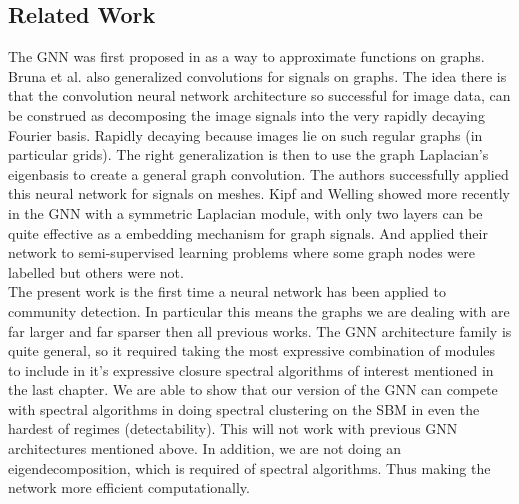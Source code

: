 \subsection{Related Work}
The GNN was first proposed in \cite{GNN} as a way to approximate functions on graphs. Bruna et al. also generalized convolutions for signals on graphs\cite{Bruna}.  The idea there is that the convolution neural network architecture so successful for image data, can be construed as decomposing the image signals into the very rapidly decaying Fourier basis.  Rapidly decaying because images lie on such regular graphs (in particular grids). The right generalization is then to use the graph Laplacian's eigenbasis to create a general graph convolution.  The authors successfully applied this neural network for signals on meshes.  Kipf and Welling showed more recently in \cite{kipf2016semi} the GNN with a symmetric Laplacian module, with only two layers can be quite effective as a embedding mechanism for graph signals.  And applied their network to semi-supervised learning problems where some graph nodes were labelled but others were not.\\

The present work is the first time a neural network has been applied to community detection.  In particular this means the graphs we are dealing with are far larger and far sparser then all previous works.  The GNN architecture family is quite general, so it required taking the most expressive combination of modules to include in it's expressive closure spectral algorithms of interest mentioned in the last chapter.  We are able to show that our version of the GNN can compete with spectral algorithms in doing spectral clustering on the SBM in even the hardest of regimes (detectability).  This will not work with previous GNN architectures mentioned above.  In addition, we are not doing an eigendecomposition, which is required of spectral algorithms.  Thus making the network more efficient computationally.  %



